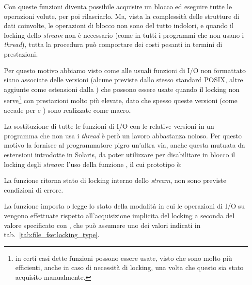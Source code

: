 Con queste funzioni diventa possibile acquisire un blocco ed eseguire tutte le
operazioni volute, per poi rilasciarlo. Ma, vista la complessità delle
strutture di dati coinvolte, le operazioni di blocco non sono del tutto
indolori, e quando il locking dello \textit{stream} non è necessario (come in
tutti i programmi che non usano i \textit{thread}), tutta la procedura può
comportare dei costi pesanti in termini di prestazioni. 

Per questo motivo abbiamo visto come alle usuali funzioni di I/O non
formattato siano associate delle versioni  (alcune previste
dallo stesso standard POSIX, altre aggiunte come estensioni dalla )
che possono essere usate quando il locking non serve\footnote{in certi casi
  dette funzioni possono essere usate, visto che sono molto più efficienti,
  anche in caso di necessità di locking, una volta che questo sia stato
  acquisito manualmente.}  con prestazioni molto più elevate, dato che spesso
queste versioni (come accade per  e ) sono realizzate
come macro.

La sostituzione di tutte le funzioni di I/O con le relative versioni
 in un programma che non usa i \textit{thread} è però un
lavoro abbastanza noioso. Per questo motivo la  fornisce al
programmatore pigro un'altra via, anche questa mutuata da estensioni
introdotte in Solaris, da poter utilizzare per disabilitare in blocco il
locking degli \textit{stream}: l'uso della funzione ,
il cui prototipo è:

\begin{funcproto}{
}

{La funzione ritorna stato di locking interno dello \textit{stream}, non sono
  previste condizioni di errore.}  
\end{funcproto}

La funzione imposta o legge lo stato della modalità in cui le operazioni di
I/O su  vengono effettuate rispetto all'acquisizione implicita
del locking a seconda del valore specificato con , che può
assumere uno dei valori indicati in tab.~\ref{tab:file_fsetlocking_type}.

